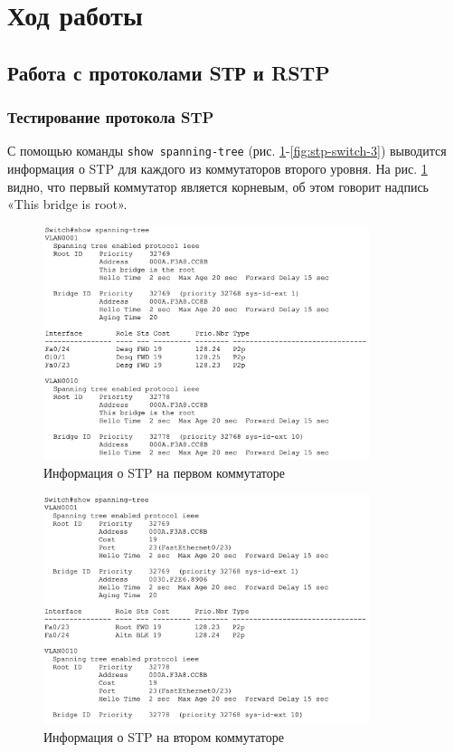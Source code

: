 \documentclass[a4paper, 14pt]{extarticle}
\begin{document}
\section{Ход работы}

\subsection{Работа с протоколами SТР и RSTP}

\subsubsection{Тестирование протокола STP}

С помощью команды \texttt{show spanning-tree} (рис.
\ref{fig:stp-switch-1}-\ref{fig:stp-switch-3}) выводится информация о STP для
каждого из коммутаторов второго уровня. На рис. \ref{fig:stp-switch-1} видно,
что первый коммутатор является корневым, об этом говорит надпись «This bridge is
root».

\begin{figure}[H]
  \centering
  \includegraphics[width=0.85\textwidth]{images/stp/switch-1.png}
  \caption{Информация о STP на первом коммутаторе}
  \label{fig:stp-switch-1}
\end{figure}

\begin{figure}[H]
  \centering
  \includegraphics[width=0.85\textwidth]{images/stp/switch-2.png}
  \caption{Информация о STP на втором коммутаторе}
  \label{fig:stp-switch-2}
\end{figure}
\end{document}
